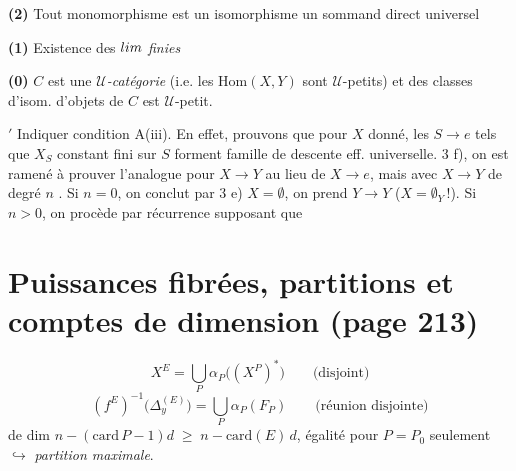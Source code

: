 \documentclass[11pt,a4paper]{article}
\begin{document}
\textbf{(2)} Tout monomorphisme est un isomorphisme  un sommand direct
universel

\textbf{(1)} Existence des $\varprojlim$ \emph{finies}


\textbf{(0)} $C$ est une \emph{$\mathcal{U}$-catégorie} (i.e. les
$\mathrm{Hom}(X, Y)$ sont $\mathcal{U}$-petits) et  des
classes d'isom. d'objets de $C$ est $\mathcal{U}$-petit.

$'$ Indiquer condition A(iii). En effet, prouvons que pour $X$ \ill{} donné,
les $S \to e$ tels que $X_S$ constant fini sur $S$ forment \ill{} famille de
descente eff. universelle.  3 f), on est ramené à prouver
l'analogue pour $X \longrightarrow Y$ au lieu de $X \longrightarrow e$, mais avec
$X \longrightarrow Y$ de degré $n$ . Si $n = 0$, on conclut par 3 e)
 $X = \emptyset$, on prend $Y \longrightarrow Y$
($X = \emptyset_Y$\,!). Si $n > 0$, on procède par récurrence supposant que

\section*{Puissances fibrées, partitions et comptes de dimension (page 213)}





\[
  X^E = \bigcup_P \alpha_P\bigl((X^P)^{\ast}\bigr)
  \qquad \text{(disjoint)}
\]
\[
  (f^E)^{-1}\bigl(\Delta_y^{(E)}\bigr) = \bigcup_P \alpha_P(F_P)
  \qquad \text{(réunion disjointe)}
\]
de dim $n - (\mathrm{card}\,P - 1)d \;\geq\; n - \mathrm{card}(E)\,d$, égalité
pour $P = P_0$ seulement $\hookrightarrow$ \emph{partition maximale}.
\end{document}
